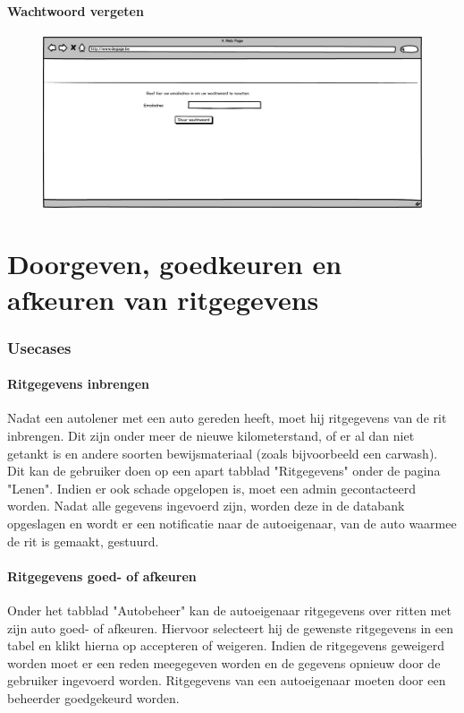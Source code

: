 \documentclass[11pt,a4paper,oneside]{article}
\begin{document}
\subsection{Wachtwoord vergeten}
\begin{figure}[H]\includegraphics[width=\textwidth]{../../mockups/wachtwoordvergeten.png}\end{figure}

\setcounter{section}{0}
\setcounter{subsection}{0}
\part{Doorgeven, goedkeuren en afkeuren van ritgegevens}

\section{Usecases}
\subsection{Ritgegevens inbrengen}
Nadat een autolener met een auto gereden heeft, moet hij ritgegevens van de rit inbrengen. Dit zijn onder meer de nieuwe kilometerstand, of er al dan niet getankt is en andere soorten bewijsmateriaal (zoals bijvoorbeeld een carwash). Dit kan de gebruiker doen op een apart tabblad "Ritgegevens" onder de pagina "Lenen". Indien er ook schade opgelopen is, moet een admin gecontacteerd worden. Nadat alle gegevens ingevoerd zijn, worden deze in de databank opgeslagen en wordt er een notificatie naar de autoeigenaar, van de auto waarmee de rit is gemaakt, gestuurd.

\subsection{Ritgegevens goed- of afkeuren}
Onder het tabblad "Autobeheer" kan de autoeigenaar ritgegevens over ritten met zijn auto goed- of afkeuren. Hiervoor selecteert hij de gewenste ritgegevens in een tabel en klikt hierna op accepteren of weigeren. Indien de ritgegevens geweigerd worden moet er een reden meegegeven worden en de gegevens opnieuw door de gebruiker ingevoerd worden. Ritgegevens van een autoeigenaar moeten door een beheerder goedgekeurd worden.
\end{document}

